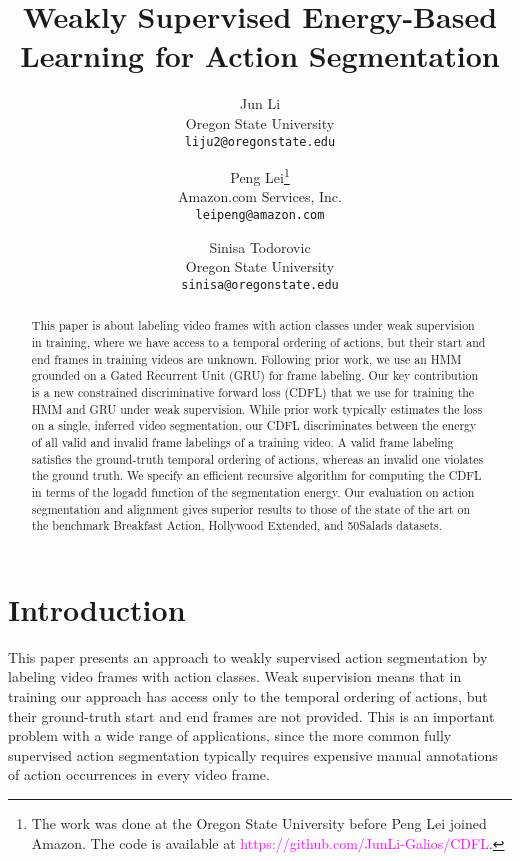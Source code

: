 \documentclass[10pt,twocolumn,letterpaper]{article}
\begin{document}
\title{Weakly Supervised Energy-Based Learning for Action Segmentation}

\author{Jun Li\\
Oregon State University\\
{\tt\small liju2@oregonstate.edu}
\and  
 Peng Lei\thanks{The work was done at the Oregon State University before Peng Lei joined Amazon. \textsuperscript{\dag}The code is available at \textcolor{magenta}{https://github.com/JunLi-Galios/CDFL}.}\\
 Amazon.com Services, Inc.\\
 {\tt\small  leipeng@amazon.com}
 \and 
 Sinisa Todorovic\\
 Oregon State University\\
 {\tt\small sinisa@oregonstate.edu}
 }
\newcommand\model{Constrained Discriminative Forward Loss}
\newcommand\abbrmodel{CDFL}

\maketitle
\ificcvfinal\thispagestyle{empty}\fi

\begin{abstract}
   This paper is about labeling video frames with action classes under weak supervision in training, where we have access to a temporal ordering of actions, but their start and end frames in training videos are unknown. Following prior work, we use an HMM grounded on a Gated Recurrent Unit (GRU) for frame labeling. Our key contribution is a new constrained discriminative forward loss (CDFL) that we use for training the HMM and GRU under weak supervision. While prior work typically estimates the loss on a single, inferred video segmentation, our CDFL discriminates between the energy of all valid and invalid frame labelings of a training video. A valid frame labeling satisfies the ground-truth temporal ordering of actions, whereas an invalid one violates the ground truth. We specify an efficient recursive algorithm for computing the CDFL in terms of the logadd function of the segmentation energy. Our evaluation on action segmentation and alignment gives superior results to those of the state of the art on the benchmark Breakfast Action, Hollywood Extended, and 50Salads datasets.\textsuperscript{\dag}\end{abstract}

\section{Introduction}\label{sec:Introduction}
This paper presents an approach to weakly supervised action segmentation by labeling video frames with action classes. Weak supervision means that in training our approach has access only to the temporal ordering of actions, but their ground-truth start and end frames are not provided. This is an important problem with a wide range of applications, since the more common fully supervised action segmentation typically requires expensive manual annotations of action occurrences in every video frame.
\end{document}
